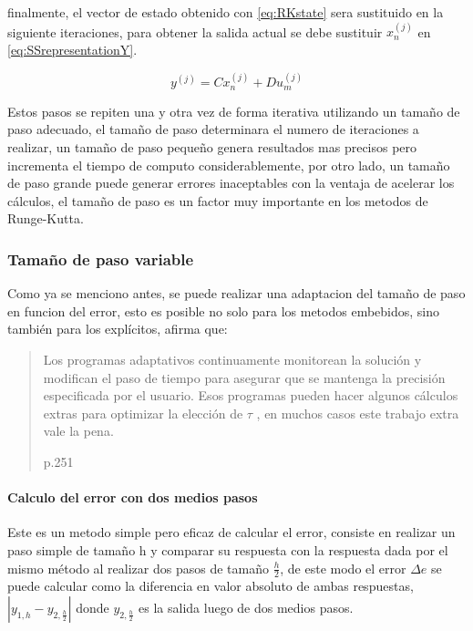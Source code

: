             \noindent finalmente, el vector de estado obtenido con \cref{eq:RKstate} sera sustituido en la siguiente iteraciones, para obtener la salida actual se debe sustituir $x_n^{(j)}$  en \cref{eq:SSrepresentationY}. 
            
            \begin{equation}
				y^{(j)} = Cx_n^{(j)} + Du_m^{(j)} \label{eq:SSrepresentationY}
            \end{equation}
            
            Estos pasos se repiten una y otra vez de forma iterativa utilizando un tamaño de paso adecuado, el tamaño de paso determinara el numero de iteraciones a realizar, un tamaño de paso pequeño genera resultados mas precisos pero incrementa el tiempo de computo considerablemente, por otro lado, un tamaño de paso grande puede generar errores inaceptables con la ventaja de acelerar los cálculos, el tamaño de paso es un factor muy importante en los metodos de Runge-Kutta.

        \subsubsection{Tamaño de paso variable}

            Como ya se menciono antes, se puede realizar una adaptacion del tamaño de paso en funcion del error, esto es posible no solo para los metodos embebidos, sino también para los explícitos, \textcite{roganprogramacion} afirma que: \blockquote[p.251]{Los programas adaptativos continuamente monitorean la solución y modifican el paso de
            tiempo para asegurar que se mantenga la precisión especificada por el usuario. Esos programas
            pueden hacer algunos cálculos extras para optimizar la elección de $\tau$ , en muchos casos este
            trabajo extra vale la pena.}
            
            \paragraph{Calculo del error con dos medios pasos}

                Este es un metodo simple pero eficaz de calcular el error, consiste en realizar un paso simple de tamaño h y comparar su respuesta con la respuesta dada por el mismo método al realizar dos pasos de tamaño $\frac{h}{2}$, de este modo el error $\Delta e$ se puede calcular como la diferencia en valor absoluto de ambas respuestas, $\left|y_{1,h} - y_{2,\frac{h}{2}}\right|$ donde $y_{2,\frac{h}{2}}$ es la salida luego de dos medios pasos.
            
